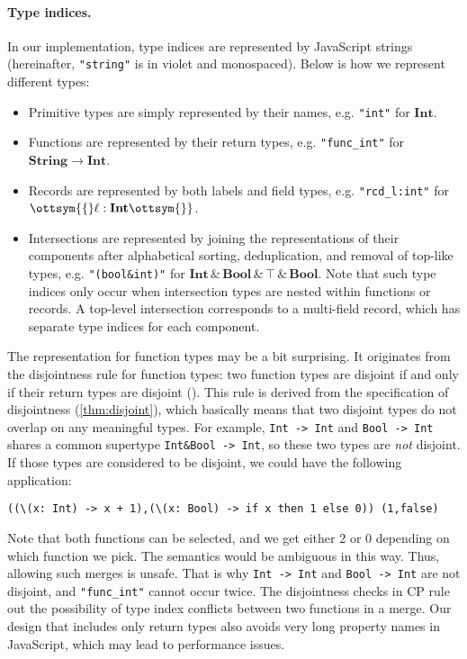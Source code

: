 \paragraph{Type indices.} \label{sec:index}
In our implementation, type indices are represented by JavaScript strings
(hereinafter, \lstinline{"string"} is in violet and monospaced). Below is how we
represent different types:
\begin{itemize}
\item Primitive types are simply represented by their names,
      e.g. \lstinline{"int"} for $ \mathbf{Int} $.
\item Functions are represented by their return types,
      e.g. \lstinline{"func_int"} for $ \mathbf{String}   \rightarrow   \mathbf{Int} $.
\item Records are represented by both labels and field types,
      e.g. \lstinline{"rcd_l:int"} for $\ottsym{\{}  \ell  :   \mathbf{Int}   \ottsym{\}}$.
\item Intersections are represented by joining the representations of their
      components after alphabetical sorting, deduplication, and removal of
      top-like types, e.g. \lstinline{"(bool&int)"} for $ \mathbf{Int}   \, {\&} \,   \mathbf{Bool}   \, {\&} \,   \top   \, {\&} \,   \mathbf{Bool} $.
      Note that such type indices only occur when intersection types are nested
      within functions or records. A top-level intersection corresponds to a
      multi-field record, which has separate type indices for each component.
\end{itemize}
The representation for function types may be a bit surprising. It originates
from the disjointness rule for function types: two function types are disjoint
if and only if their return types are disjoint (). This rule
is derived from the specification of disjointness (\autoref{thm:disjoint}),
which basically means that two disjoint types do not overlap on any meaningful
types. For example, \lstinline{Int -> Int} and \lstinline{Bool -> Int} shares a
common supertype \lstinline{Int&Bool -> Int}, so these two types are \emph{not}
disjoint. If those types are considered to be disjoint, we could have the
following application:
\begin{lstlisting}
((\(x: Int) -> x + 1),(\(x: Bool) -> if x then 1 else 0)) (1,false)
\end{lstlisting}
Note that both functions can be selected, and we get either 2 or 0 depending on
which function we pick. The semantics would be ambiguous in this way. Thus,
allowing such merges is unsafe. That is why \lstinline{Int -> Int} and
\lstinline{Bool -> Int} are not disjoint, and \lstinline{"func_int"} cannot
occur twice. The disjointness checks in CP rule out the possibility of type
index conflicts between two functions in a merge. Our design that includes only
return types also avoids very long property names in JavaScript, which may lead
to performance issues.


